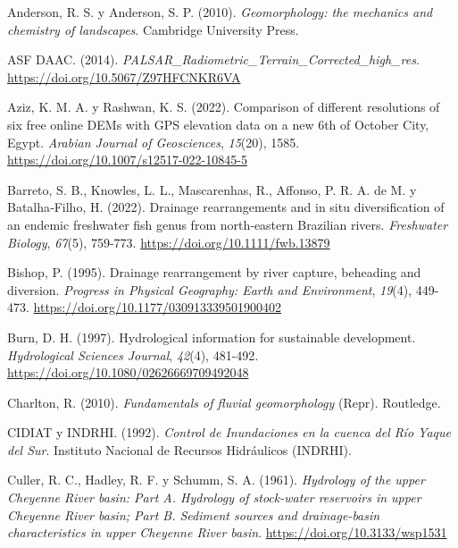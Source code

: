 \documentclass[spanish]{article}
\newlength{\cslhangindent}
\newlength{\cslentryspacingunit} %
\newenvironment{CSLReferences}[2] %
 {%
  \setlength{\parindent}{0pt}
  \ifodd #1
  \let\oldpar\par
  \def\par{\hangindent=\cslhangindent\oldpar}
  \fi
  \setlength{\parskip}{#2\cslentryspacingunit}
 }%
 {}
\begin{document}
\hypertarget{refs}{}
\begin{CSLReferences}{1}{0}
\leavevmode{}%
Anderson, R. S. y Anderson, S. P. (2010). \emph{Geomorphology: the
mechanics and chemistry of landscapes}. Cambridge University Press.

\leavevmode{}%
ASF DAAC. (2014).
\emph{PALSAR{\_}Radiometric{\_}Terrain{\_}Corrected{\_}high{\_}res}.
\url{https://doi.org/10.5067/Z97HFCNKR6VA}

\leavevmode{}%
Aziz, K. M. A. y Rashwan, K. S. (2022). Comparison of different
resolutions of six free online DEMs with GPS elevation data on a new 6th
of October City, Egypt. \emph{Arabian Journal of Geosciences},
\emph{15}(20), 1585. \url{https://doi.org/10.1007/s12517-022-10845-5}

\leavevmode{}%
Barreto, S. B., Knowles, L. L., Mascarenhas, R., Affonso, P. R. A. de M.
y Batalha‐Filho, H. (2022). Drainage rearrangements and in situ
diversification of an endemic freshwater fish genus from north‐eastern
{Brazilian} rivers. \emph{Freshwater Biology}, \emph{67}(5), 759-773.
\url{https://doi.org/10.1111/fwb.13879}

\leavevmode{}%
Bishop, P. (1995). Drainage rearrangement by river capture, beheading
and diversion. \emph{Progress in Physical Geography: Earth and
Environment}, \emph{19}(4), 449-473.
\url{https://doi.org/10.1177/030913339501900402}

\leavevmode{}%
Burn, D. H. (1997). Hydrological information for sustainable
development. \emph{Hydrological Sciences Journal}, \emph{42}(4),
481-492. \url{https://doi.org/10.1080/02626669709492048}

\leavevmode{}%
Charlton, R. (2010). \emph{Fundamentals of fluvial geomorphology}
(Repr). Routledge.

\leavevmode{}%
CIDIAT y INDRHI. (1992). \emph{{Control de Inundaciones en la cuenca del
Río Yaque del Sur}}. {Instituto Nacional de Recursos Hidráulicos
(INDRHI)}.

\leavevmode{}%
Culler, R. C., Hadley, R. F. y Schumm, S. A. (1961). \emph{Hydrology of
the upper {Cheyenne} {River} basin: {Part} {A}. {Hydrology} of
stock-water reservoirs in upper {Cheyenne} {River} basin; {Part} {B}.
{Sediment} sources and drainage-basin characteristics in upper
{Cheyenne} {River} basin}. \url{https://doi.org/10.3133/wsp1531}


\end{CSLReferences}
\end{document}
